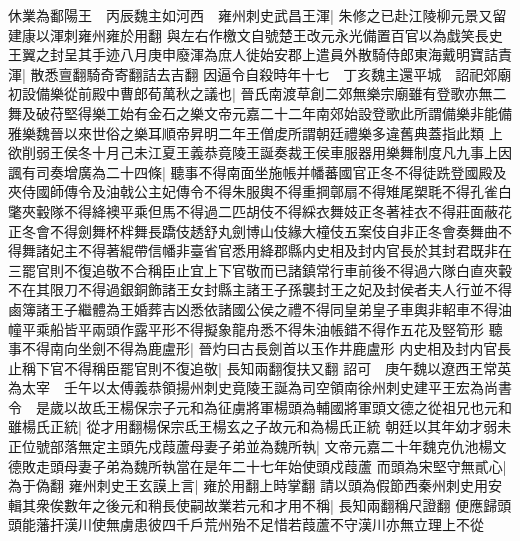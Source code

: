 休業為鄱陽王　丙辰魏主如河西　雍州刺史武昌王渾|{
	朱修之已赴江陵柳元景又留建康以渾刺雍州雍於用翻}
與左右作檄文自號楚王改元永光備置百官以為戱笑長史王翼之封呈其手迹八月庚申廢渾為庶人徙始安郡上遣員外散騎侍郎東海戴明寶詰責渾|{
	散悉亶翻騎奇寄翻詰去吉翻}
因逼令自殺時年十七　丁亥魏主還平城　詔祀郊廟初設備樂從前殿中曹郎荀萬秋之議也|{
	晉氏南渡草創二郊無樂宗廟雖有登歌亦無二舞及破苻堅得樂工始有金石之樂文帝元嘉二十二年南郊始設登歌此所謂備樂非能備雅樂魏晉以來世俗之樂耳順帝昇明二年王僧䖍所謂朝廷禮樂多違舊典蓋指此類}
上欲削弱王侯冬十月己未江夏王義恭竟陵王誕奏裁王侯車服器用樂舞制度凡九事上因諷有司奏增廣為二十四條|{
	聽事不得南面坐施帳并幡蕃國官正冬不得徒跣登國殿及夾侍國師傳令及油戟公主妃傳令不得朱服輿不得重掆鄣扇不得雉尾槊毦不得孔雀白氅夾轂隊不得絳襖平乘但馬不得過二匹胡伎不得綵衣舞妓正冬著袿衣不得莊面蔽花正冬會不得劍舞杯柈舞長蹻伎䞬舒丸劍博山伎緣大橦伎五案伎自非正冬會奏舞曲不得舞諸妃主不得著緄帶信幡非臺省官悉用絳郡縣内史相及封内官長於其封君既非在三罷官則不復追敬不合稱臣止宜上下官敬而已諸鎮常行車前後不得過六隊白直夾轂不在其限刀不得過銀銅飾諸王女封縣主諸王子孫襲封王之妃及封侯者夫人行並不得鹵簿諸王子繼體為王婚葬吉凶悉依諸國公侯之禮不得同皇弟皇子車輿非軺車不得油幢平乘船皆平兩頭作露平形不得擬象龍舟悉不得朱油帳錯不得作五花及竪筍形}
聽事不得南向坐劍不得為鹿盧形|{
	晉灼曰古長劍首以玉作井鹿盧形}
内史相及封内官長止稱下官不得稱臣罷官則不復追敬|{
	長知兩翻復扶又翻}
詔可　庚午魏以遼西王常英為太宰　壬午以太傅義恭領揚州刺史竟陵王誕為司空領南徐州刺史建平王宏為尚書令　是歲以故氐王楊保宗子元和為征虜將軍楊頭為輔國將軍頭文德之從祖兄也元和雖楊氏正統|{
	從才用翻楊保宗氐王楊玄之子故元和為楊氏正統}
朝廷以其年幼才弱未正位號部落無定主頭先戍葭蘆母妻子弟並為魏所執|{
	文帝元嘉二十年魏克仇池楊文德敗走頭母妻子弟為魏所執當在是年二十七年始使頭戍葭蘆}
而頭為宋堅守無貳心|{
	為于偽翻}
雍州刺史王玄謨上言|{
	雍於用翻上時掌翻}
請以頭為假節西秦州刺史用安輯其衆俟數年之後元和稍長使嗣故業若元和才用不稱|{
	長知兩翻稱尺證翻}
便應歸頭頭能藩扞漢川使無虜患彼四千戶荒州殆不足惜若葭蘆不守漢川亦無立理上不從

